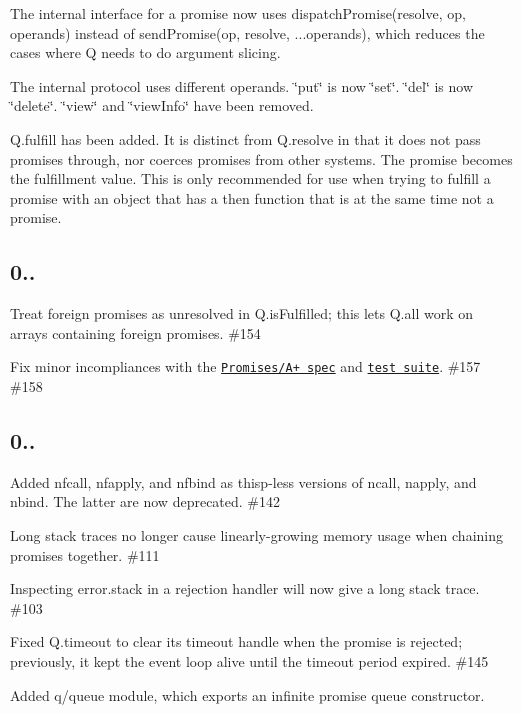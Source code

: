 \begin{DoxyItemize}
\item The internal interface for a promise now uses {\ttfamily dispatch\+Promise(resolve, op, operands)} instead of {\ttfamily send\+Promise(op, resolve, ...operands)}, which reduces the cases where Q needs to do argument slicing.
\item The internal protocol uses different operands. \char`\"{}put\char`\"{} is now \char`\"{}set\char`\"{}. \char`\"{}del\char`\"{} is now \char`\"{}delete\char`\"{}. \char`\"{}view\char`\"{} and \char`\"{}view\+Info\char`\"{} have been removed.
\item {\ttfamily Q.\+fulfill} has been added. It is distinct from {\ttfamily Q.\+resolve} in that it does not pass promises through, nor coerces promises from other systems. The promise becomes the fulfillment value. This is only recommended for use when trying to fulfill a promise with an object that has a {\ttfamily then} function that is at the same time not a promise.
\end{DoxyItemize}

\subsection*{0..}


\begin{DoxyItemize}
\item Treat foreign promises as unresolved in {\ttfamily Q.\+is\+Fulfilled}; this lets {\ttfamily Q.\+all} work on arrays containing foreign promises. \#154
\item Fix minor incompliances with the \href{http://promises-aplus.github.com/promises-spec/}{\tt Promises/\+A+ spec} and \href{https://github.com/promises-aplus/promises-tests}{\tt test suite}. \#157 \#158
\end{DoxyItemize}

\subsection*{0..}


\begin{DoxyItemize}
\item Added {\ttfamily nfcall}, {\ttfamily nfapply}, and {\ttfamily nfbind} as {\ttfamily thisp}-\/less versions of {\ttfamily ncall}, {\ttfamily napply}, and {\ttfamily nbind}. The latter are now deprecated. \#142
\item Long stack traces no longer cause linearly-\/growing memory usage when chaining promises together. \#111
\item Inspecting {\ttfamily error.\+stack} in a rejection handler will now give a long stack trace. \#103
\item Fixed {\ttfamily Q.\+timeout} to clear its timeout handle when the promise is rejected; previously, it kept the event loop alive until the timeout period expired. \#145 
\item Added {\ttfamily q/queue} module, which exports an infinite promise queue constructor.
\end{DoxyItemize}

